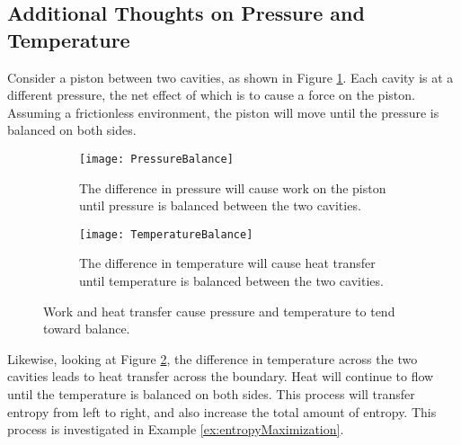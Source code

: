 \subsection{Additional Thoughts on Pressure and Temperature}
Consider a piston between two cavities, as shown in Figure \ref{fig:doublePistonWork}.  Each cavity is at a different pressure, the net effect of which is to cause a force on the piston.  Assuming a frictionless environment, the piston will move until the pressure is balanced on both sides.
\begin{figure}[H]
\centering
\begin{subfigure}{.45\textwidth}
  \centering
  \texttt{[image: PressureBalance]}
  \caption{The difference in pressure will cause work on the piston until pressure is balanced between the two cavities.}
  \label{fig:doublePistonWork}
\end{subfigure}%
\hfill
\begin{subfigure}{.45\textwidth}
  \centering
  \texttt{[image: TemperatureBalance]}
  \caption{The difference in temperature will cause heat transfer until temperature is balanced between the two cavities.}
  \label{fig:doubleCavityHeatTransfer}
\end{subfigure}
\caption{Work and heat transfer cause pressure and temperature to tend toward balance.}
\label{fig:statMechPressureAndTemp}
\end{figure}
Likewise, looking at Figure \ref{fig:doubleCavityHeatTransfer}, the difference in temperature across the two cavities leads to heat transfer across the boundary.  Heat will continue to flow until the temperature is balanced on both sides.  This process will transfer entropy from left to right, and also increase the total amount of entropy.  This process is investigated in Example \ref{ex:entropyMaximization}.

